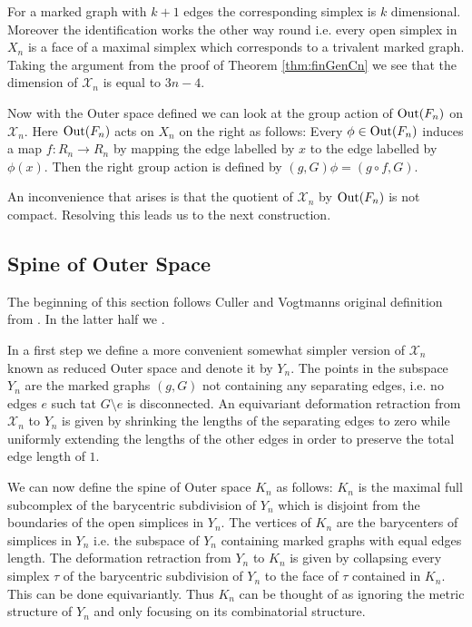 For a marked graph with $k+1$ edges the corresponding simplex is $k$ dimensional.
Moreover the identification works the other way round i.e. every open simplex in $X_{n}$ 
is a face of a maximal simplex which corresponds to a trivalent marked graph.
Taking the argument from the proof of Theorem \ref{thm:finGenCn} we see that the dimension of $\mathcal{X}_{n}$ is equal to $3n -4$.

Now with the Outer space defined we can look at the group action of $\operatorname{Out}(F_{n})$ on $\mathcal{X}_{n}$.
Here $\operatorname{Out}(F_{n})$ acts on $X_{n}$ on the right as follows:
Every $\phi \in \operatorname{Out}(F_{n})$ induces a map $f: R_{n} \to R_{n}$ by mapping the edge labelled
by $x$ to the edge labelled by $\phi(x)$.
Then the right group action is defined by $(g,G) \phi = (g \circ f, G)$.

An inconvenience that arises is that the quotient of $\mathcal{X}_{n}$ by $\operatorname{Out}(F_{n})$ is not compact.
Resolving this leads us to the next construction.

\subsection{Spine of Outer Space}
The beginning of this section follows Culler and Vogtmanns original definition from \cite{vogtmann86}.
In the latter half we \cite{vogtmann16}.

In a first step we define a more convenient somewhat simpler version of $\mathcal{X}_{n}$ known as reduced Outer space and denote it by $Y_{n}$.
The points in the subspace $Y_{n}$ are the marked graphs $(g,G)$ not containing any separating edges, i.e.
no edges $e$ such tat $G \setminus e$ is disconnected.
An equivariant deformation retraction from $\mathcal{X}_{n}$ to $Y_{n}$ is given by shrinking the lengths of
the separating edges to zero while uniformly extending the lengths of the other edges in order to preserve the total edge length of $1$.

We can now define the spine of Outer space $K_{n}$ as follows:
$K_{n}$ is the maximal full subcomplex of the barycentric subdivision of $Y_{n}$ which is disjoint from the boundaries of the open simplices in $Y_{n}$.
The vertices of $K_{n}$ are the barycenters of simplices in $Y_{n}$ i.e. the subspace of $Y_{n}$ containing marked graphs 
with equal edges length. The deformation retraction from $Y_{n}$ to $K_{n}$ is given by
collapsing every simplex $\tau$ of the barycentric subdivision of $Y_{n}$ to the face of $\tau$ contained in $K_{n}$.
This can be done equivariantly.
Thus $K_{n}$ can be thought of as ignoring the metric structure of $Y_{n}$ and only focusing on its combinatorial structure.

